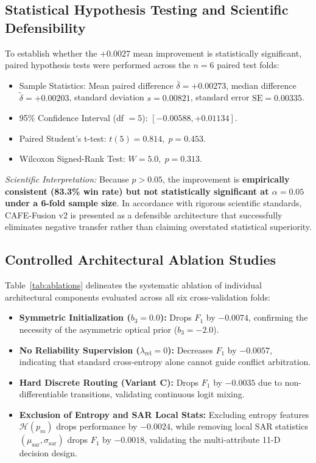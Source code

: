 \documentclass[conference]{IEEEtran}
\begin{document}
\subsection{Statistical Hypothesis Testing and Scientific Defensibility}
To establish whether the $+0.0027$ mean improvement is statistically significant, paired hypothesis tests were performed across the $n=6$ paired test folds:
\begin{itemize}
    \item Sample Statistics: Mean paired difference $\bar{\delta} = +0.00273$, median difference $\tilde{\delta} = +0.00203$, standard deviation $s = 0.00821$, standard error $\text{SE} = 0.00335$.
    \item 95\% Confidence Interval (df $= 5$): $[-0.00588, +0.01134]$.
    \item Paired Student's t-test: $t(5) = 0.814, \; p = 0.453$.
    \item Wilcoxon Signed-Rank Test: $W = 5.0, \; p = 0.313$.
\end{itemize}
\textit{Scientific Interpretation:} Because $p > 0.05$, the improvement is \textbf{empirically consistent (83.3\% win rate) but not statistically significant at $\alpha = 0.05$ under a 6-fold sample size}. In accordance with rigorous scientific standards, CAFE-Fusion v2 is presented as a defensible architecture that successfully eliminates negative transfer rather than claiming overstated statistical superiority.

\subsection{Controlled Architectural Ablation Studies}
Table~\ref{tab:ablations} delineates the systematic ablation of individual architectural components evaluated across all six cross-validation folds:
\begin{itemize}
    \item \textbf{Symmetric Initialization ($b_3 = 0.0$):} Drops $F_1$ by $-0.0074$, confirming the necessity of the asymmetric optical prior ($b_3 = -2.0$).
    \item \textbf{No Reliability Supervision ($\lambda_{\text{rel}} = 0$):} Decreases $F_1$ by $-0.0057$, indicating that standard cross-entropy alone cannot guide conflict arbitration.
    \item \textbf{Hard Discrete Routing (Variant C):} Drops $F_1$ by $-0.0035$ due to non-differentiable transitions, validating continuous logit mixing.
    \item \textbf{Exclusion of Entropy and SAR Local Stats:} Excluding entropy features $\mathcal{H}(p_m)$ drops performance by $-0.0024$, while removing local SAR statistics $(\mu_{\text{sar}}, \sigma_{\text{sar}})$ drops $F_1$ by $-0.0018$, validating the multi-attribute 11-D decision design.
\end{itemize}
\end{document}
